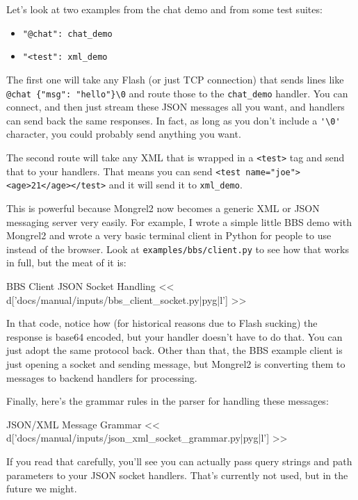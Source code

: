 Let's look at two examples from the chat demo and from some test suites:

\begin{itemize}
\item \verb|"@chat": chat_demo|
\item \verb|"<test": xml_demo|
\end{itemize}

The first one will take any Flash (or just TCP connection) that sends lines like
\verb|@chat {"msg": "hello"}\0| and route those to the \verb|chat_demo| handler.
You can connect, and then just stream these JSON messages all you want, and handlers
can send back the same responses.  In fact, as long as you don't include a \verb|'\0'|
character, you could probably send anything you want.

The second route will take any XML that is wrapped in a \verb|<test>| tag and send
that to your handlers.  That means you can send \verb|<test name="joe"><age>21</age></test>|
and it will send it to \verb|xml_demo|.

This is powerful because Mongrel2 now becomes a generic XML or JSON messaging
server very easily.  For example, I wrote a simple little BBS demo with Mongrel2
and wrote a very basic terminal client in Python for people to use instead
of the browser.  Look at \verb|examples/bbs/client.py| to see how that works in
full, but the meat of it is:

\begin{code}{BBS Client JSON Socket Handling}
<< d['docs/manual/inputs/bbs_client_socket.py|pyg|l'] >>
\end{code}

In that code, notice how (for historical reasons due to Flash sucking) the
response is base64 encoded, but your handler doesn't have to do that.  You can
just adopt the same protocol back.  Other than that, the BBS example client
is just opening a socket and sending message, but Mongrel2 is converting them
to messages to backend handlers for processing.

Finally, here's the grammar rules in the parser for handling these messages:

\begin{code}{JSON/XML Message Grammar}
<< d['docs/manual/inputs/json_xml_socket_grammar.py|pyg|l'] >>
\end{code}

If you read that carefully, you'll see you can actually pass query strings
and path parameters to your JSON socket handlers.  That's currently not
used, but in the future we might.

